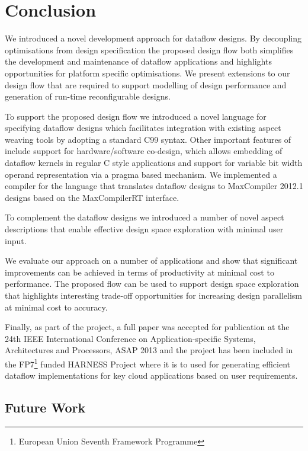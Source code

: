 \chapter{Conclusion}

We introduced a novel development approach for dataflow designs. By
decoupling optimisations from design specification the proposed design
flow both simplifies the development and maintenance of dataflow
applications and highlights opportunities for platform specific
optimisations. We present extensions to our design flow that are
required to support modelling of design performance and generation of
run-time reconfigurable designs.

To support the proposed design flow we introduced \FAST{} a novel
language for specifying dataflow designs which facilitates integration
with existing aspect weaving tools by adopting a standard C99
syntax. Other important features of \FAST{} include support for
hardware/software co-design, which allows embedding of dataflow
kernels in regular C style applications and support for variable bit
width operand representation via a pragma based mechanism. We
implemented a compiler for the \FAST{} language that translates
\FAST{} dataflow designs to MaxCompiler 2012.1 designs based on the
MaxCompilerRT interface.

To complement the \FAST{} dataflow designs we introduced a number of
novel aspect descriptions that enable effective design space
exploration with minimal user input.

We evaluate our approach on a number of applications and show that
significant improvements can be achieved in terms of productivity at
minimal cost to performance. The proposed flow can be used to support
design space exploration that highlights interesting trade-off
opportunities for increasing design parallelism at minimal cost to
accuracy.

Finally, as part of the project, a full paper was accepted for
publication at the 24th IEEE International Conference on
Application-specific Systems, Architectures and Processors, ASAP 2013
and the project has been included in the FP7\footnote{European Union
  Seventh Framework Programme} funded HARNESS Project where it is to
used for generating efficient dataflow implementations for key cloud
applications based on user requirements.

\section{Future Work}


